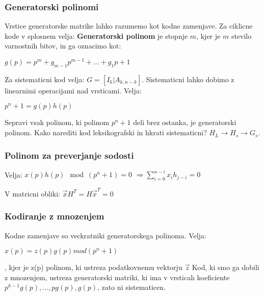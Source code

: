 \documentclass{article}
\begin{document}
\begin{multicols}{4}
\subsubsection{Generatorski polinomi}
Vrstice generatorske matrike lahko razumemo kot kodne zamenjave.
Za ciklicne kode v splosnem velja: \textbf{Generatorski polinom} je stopnje $m$, kjer je $m$ stevilo
varnostnih bitov, in ga oznacimo kot:
\begin{center}
    \begin{math}
        g(p) = p^m + g_{m-1}p^{m-1} + \dots + g_1p + 1
    \end{math}
\end{center}
Za sistematicni kod velja: $G = [I_k | A_{k, n-k}]$.
Sistematicni lahko dobimo z linearnimi operacijami nad vrsticami.
Velja:
\begin{center}
    \begin{math}
        p^n + 1 = g(p)h(p)
    \end{math}
\end{center}
Sepravi vsak polinom, ki polinom $p^n + 1$ deli brez ostanka, je generatorski polinom.
Kako narediti kod leksikografski in hkrati sistematicni? $H_L \rightarrow H_s \rightarrow G_s$.

\subsubsection{Polinom za preverjanje sodosti}
Velja: $x(p)h(p) \mod(p^n + 1) = 0$ $\Rightarrow \sum_{i=0}^{n-i} x_i h_{j-i} = 0$

V matricni obliki: $\vec{x} H^T = H\vec{x}^T = 0$
\subsubsection{Kodiranje z mnozenjem}
Kodne zamenjave so veckratniki generatorskega polinoma.
Velja:
\begin{center}
    \begin{math}
        x(p) = z(p) g(p) mod (p^n + 1)
    \end{math}
\end{center}, kjer je z(p) polinom, ki ustreza podatkovnemu vektorju $\vec{z}$
Kod, ki smo ga dobili z mnozenjem, ustreza generatorski matriki, ki ima v vrsticah
koeficiente $p^{k-1}g(p), \dots, pg(p), g(p)$, zato ni sistematicen.


\end{multicols}
\end{document}
